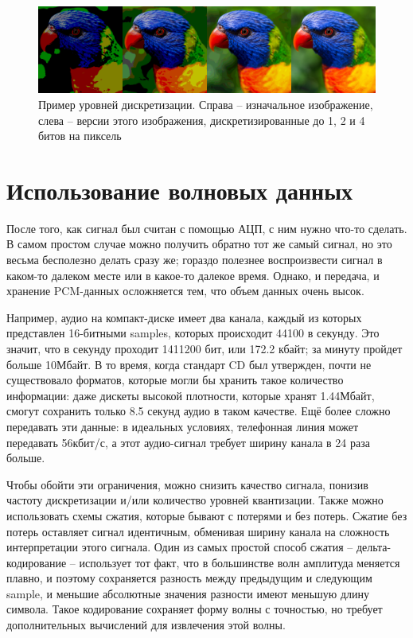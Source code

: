 \documentclass[a4page]{article}
\begin{document}
\begin{figure}
  \includegraphics[width=\linewidth]{chicken-colorized.png}
  \caption{Пример уровней дискретизации. Справа -- изначальное изображение, слева -- версии этого изображения, дискретизированные до 1, 2 и 4 битов на пиксель}
  \label{fig:downsampled-image}
\end{figure}

\section{Использование волновых данных}

После того, как сигнал был считан с помощью АЦП, с ним нужно что-то сделать.
В самом простом случае можно получить обратно тот же самый сигнал,
но это весьма бесполезно делать сразу же;
гораздо полезнее воспроизвести сигнал в каком-то далеком месте или в какое-то далекое время.
Однако, и передача, и хранение PCM-данных осложняется тем, что объем данных очень высок.

Например, аудио на компакт-диске имеет два канала, каждый из которых представлен 16-битными samples, которых происходит 44100 в секунду.
Это значит, что в секунду проходит 1411200 бит, или 172.2 кбайт; за минуту пройдет больше 10Мбайт.
В то время, когда стандарт CD был утвержден, почти не существовало форматов, которые могли бы хранить такое количество информации:
даже дискеты высокой плотности, которые хранят 1.44Мбайт, смогут сохранить только 8.5 секунд аудио в таком качестве.
Ещё более сложно передавать эти данные: в идеальных условиях, телефонная линия может передавать 56кбит/с, а этот аудио-сигнал требует ширину канала в 24 раза больше.

Чтобы обойти эти ограничения, можно снизить качество сигнала, понизив частоту дискретизации и/или количество уровней квантизации.
Также можно использовать схемы сжатия, которые бывают с потерями и без потерь.
Сжатие без потерь оставляет сигнал идентичным, обменивая ширину канала на сложность интерпретации этого сигнала.
Один из самых простой способ сжатия -- дельта-кодирование -- использует тот факт, что в большинстве волн амплитуда меняется плавно,
и поэтому сохраняется разность между предыдущим и следующим sample, и меньшие абсолютные значения разности имеют меньшую длину символа.
Такое кодирование сохраняет форму волны с точностью, но требует дополнительных вычислений для извлечения этой волны.
\end{document}

